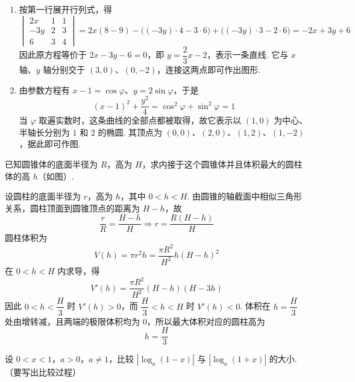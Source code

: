 \begin{solution}
\begin{enumerate}
\item 按第一行展开行列式，得
\[
\begin{vmatrix} 2x & 1 & 1 \\ -3y & 2 & 3 \\ 6 & 3 & 4 \end{vmatrix}
=2x(8-9)-\bigl((-3y)\cdot4-3\cdot6\bigr)+\bigl((-3y)\cdot3-2\cdot6\bigr)
=-2x+3y+6
\]
因此原方程等价于 \(2x-3y-6=0\)，即 \(y=\dfrac{2}{3}x-2\)，表示一条直线. 它与 \(x\) 轴、\(y\) 轴分别交于 \((3,0)\)、\((0,-2)\)，连接这两点即可作出图形.
\item 由参数方程有 \(x-1=\cos\varphi\)、\(y=2\sin\varphi\)，于是
\[
\left(x-1\right)^2+\dfrac{y^2}{4}=\cos^2\varphi+\sin^2\varphi=1
\]
当 \(\varphi\) 取遍实数时，这条曲线的全部点都被取得，故它表示以 \((1,0)\) 为中心、半轴长分别为 \(1\) 和 \(2\) 的椭圆. 其顶点为 \((0,0)\)、\((2,0)\)、\((1,2)\)、\((1,-2)\)，据此即可作图.
\end{enumerate}
\end{solution}

\begin{problem}

已知圆锥体的底面半径为 \(R\)，高为 \(H\)，求内接于这个圆锥体并且体积最大的圆柱体的高 \(h\)（如图）.

\FloatBarrier
\end{problem}

\begin{solution}
设圆柱的底面半径为 \(r\)，高为 \(h\)，其中 \(0<h<H\). 由圆锥的轴截面中相似三角形关系，圆柱顶面到圆锥顶点的距离为 \(H-h\)，故
\[
\dfrac{r}{R}=\dfrac{H-h}{H}\Longrightarrow r=\dfrac{R(H-h)}{H}
\]
圆柱体积为
\[
V(h)=\pi r^2h=\dfrac{\pi R^2}{H^2}h(H-h)^2
\]
在 \(0<h<H\) 内求导，得
\[
V'(h)=\dfrac{\pi R^2}{H^2}(H-h)(H-3h)
\]
因此 \(0<h<\dfrac{H}{3}\) 时 \(V'(h)>0\)，而 \(\dfrac{H}{3}<h<H\) 时 \(V'(h)<0\). 体积在 \(h=\dfrac{H}{3}\) 处由增转减，且两端的极限体积均为 \(0\)，所以最大体积对应的圆柱高为
\[
h=\dfrac{H}{3}
\]
\end{solution}

\begin{problem}

设 \(0<x<1\)，\(a>0\)，\(a\neq 1\)，比较 \(\left|\log_a(1-x)\right|\) 与 \(\left|\log_a(1+x)\right|\) 的大小. （要写出比较过程）
\end{problem}

